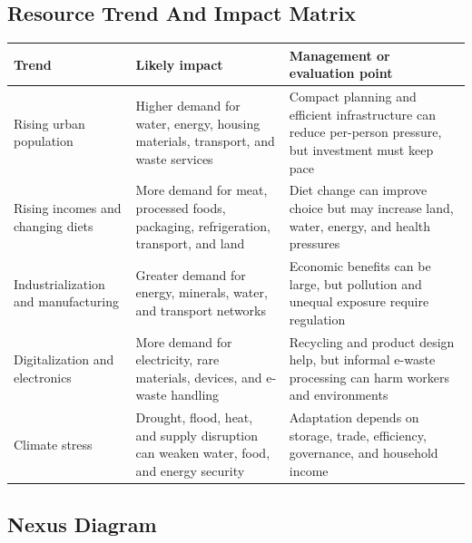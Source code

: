 \documentclass[11pt,a4paper]{article}
\begin{document}
\subsection{Resource Trend And Impact Matrix}

\begin{tabularx}{\textwidth}{L{0.22\textwidth}Y Y}
\toprule
\textbf{Trend} & \textbf{Likely impact} & \textbf{Management or evaluation point} \\
\midrule
Rising urban population & Higher demand for water, energy, housing materials,
transport, and waste services & Compact planning and efficient infrastructure
can reduce per-person pressure, but investment must keep pace \\
Rising incomes and changing diets & More demand for meat, processed foods,
packaging, refrigeration, transport, and land & Diet change can improve choice
but may increase land, water, energy, and health pressures \\
Industrialization and manufacturing & Greater demand for energy, minerals,
water, and transport networks & Economic benefits can be large, but pollution
and unequal exposure require regulation \\
Digitalization and electronics & More demand for electricity, rare materials,
devices, and e-waste handling & Recycling and product design help, but informal
e-waste processing can harm workers and environments \\
Climate stress & Drought, flood, heat, and supply disruption can weaken water,
food, and energy security & Adaptation depends on storage, trade, efficiency,
governance, and household income \\
\bottomrule
\end{tabularx}

\subsection{Nexus Diagram}
\end{document}
